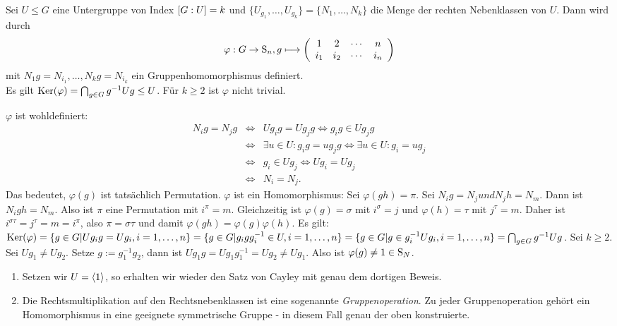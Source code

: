 \begin{satz}[Konstruktion] \label{konstruktion}\label{1.8}
 Sei $U\leq G$ eine Untergruppe von Index $\left[G:U\right]=k$ und $\lbrace U_{g_1},\ldots, U_{g_k}\rbrace=\lbrace N_1,\ldots,N_k\rbrace$ die Menge der rechten Nebenklassen von $U$. Dann wird durch 
  $$\varphi: G\to \operatorname{S}_n, g\longmapsto \left(\begin{array}{cccc} 1&2&\cdots&n\\i_1&i_2&\cdots&i_n\end{array}\right)$$ mit $N_1g=N_{i_1},\ldots, N_kg=N_{i_k}$ ein Gruppenhomomorphismus definiert.\\
  Es gilt $\operatorname{Ker}(\varphi)=\bigcap_{g\in G}g^{-1}Ug \leq U$. F\"ur $k\geq 2$ ist $\varphi$ nicht trivial.

\end{satz}

\begin{beweis}
 $\varphi$ ist wohldefiniert: 
\begin{eqnarray*}
 N_ig=N_jg &\Longleftrightarrow& Ug_ig=Ug_jg \Longleftrightarrow g_ig\in Ug_jg \\&\Longleftrightarrow& \exists u\in U:g_ig=ug_jg \Longleftrightarrow \exists u\in U:g_i=ug_j \\&\Longleftrightarrow& g_i \in Ug_j \Longleftrightarrow Ug_i=Ug_j \\&\Longleftrightarrow& N_i=N_j.
\end{eqnarray*}
Das bedeutet, $\varphi(g)$ ist tats\"achlich Permutation.
$\varphi$ ist ein Homomorphismus: Sei $\varphi(gh) = \pi$. Sei $N_ig=N_j und N_jh=N_m$. Dann ist $N_igh =N_m$. Also ist $\pi$ eine Permutation mit $i^\pi=m$. Gleichzeitig ist $\varphi(g) = \sigma$ mit $i^\sigma=j$ und $\varphi(h)=\tau$ mit $j^\tau=m$. Daher ist $i^{\sigma\tau}=j^\tau=m=i^\pi$, also $\pi=\sigma\tau$ und damit $\varphi(gh)=\varphi(g)\varphi(h)$.
Es gilt: $\operatorname{Ker}(\varphi)=\lbrace g\in G|Ug_ig=Ug_i,i=1,\ldots, n\rbrace = \lbrace g\in G|g_igg_i^{-1}\in U, i=1,\ldots, n\rbrace = \lbrace g\in G|g\in g_i^{-1}Ug_i, i=1,\ldots , n\rbrace = \bigcap_{g\in G}g^{-1}Ug$.
Sei $k\geq 2$. Sei $Ug_1\neq Ug_2$. Setze $g:=g_1^{-1}g_2$, dann ist $Ug_1g=Ug_1g_1^{-1}=Ug_2\neq Ug_1$. Also ist $\varphi(g)\neq 1\in \operatorname{S}_N$.
\end{beweis}

\begin{bemerkung*}\spspace
 \begin{enumerate}
  \item Setzen wir $U=\left<1\right>$, so erhalten wir wieder den Satz von Cayley mit genau dem dortigen Beweis.
  \item Die Rechtsmultiplikation auf den Rechtsnebenklassen ist eine sogenannte \emph{Gruppenoperation}. Zu jeder Gruppenoperation geh\"ort ein Homomorphismus in eine geeignete symmetrische Gruppe - in diesem Fall genau der oben konstruierte.
 \end{enumerate}

\end{bemerkung*}

